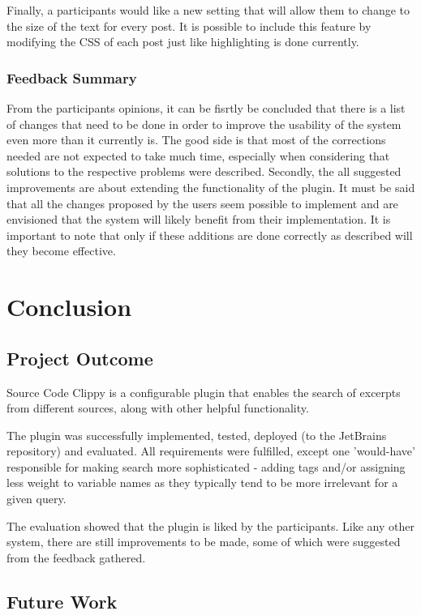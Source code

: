 \documentclass{l4proj}
\begin{document}
\noindent
Finally, a participants would like a new setting that will allow them to change to the size of the text for every post. It is possible to include this feature by modifying the CSS of each post just like highlighting is done currently.

\subsection{Feedback Summary}
From the participants opinions, it can be fisrtly be concluded that there is a list of changes that need to be done in order to improve the usability of the system even more than it currently is. The good side is that most of the corrections needed are not expected to take much time, especially when considering that solutions to the respective problems were described. Secondly, the all suggested improvements are about extending the functionality of the plugin. It must be said that all the changes proposed by the users seem possible to implement and are envisioned that the system will likely benefit from their implementation. It is important to note that only if these additions are done correctly as described will they become effective.   

\chapter{Conclusion}

\section{Project Outcome}

Source Code Clippy is a configurable plugin that enables the search of excerpts from different sources, along with other helpful functionality. 

\noindent
The plugin was successfully implemented, tested, deployed (to the JetBrains repository) and evaluated. All requirements were fulfilled, except one 'would-have' responsible for making search more sophisticated - adding tags and/or assigning less weight to variable names as they typically tend to be more irrelevant for a given query.

\noindent
The evaluation showed that the plugin is liked by the participants. Like any other system, there are still improvements to be made, some of which were suggested from the feedback gathered.

\section{Future Work}
\end{document}
